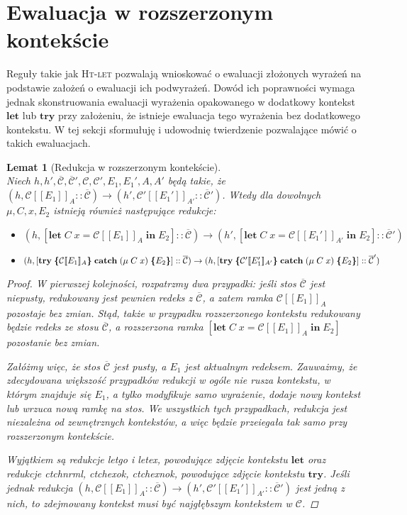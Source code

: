 \documentclass[]{pracamgr}
\renewcommand \| {\hspace{0.75em} | \hspace{0.75em} }
\renewcommand \[ {[\![}
\renewcommand \] {]\!]}
\newtheorem{lemma}{Lemat}
\theoremstyle{definition}
\newcommand{\mmod}{\mu\xspace}
\newcommand{\jlet}{\mathbf{let}\xspace}
\newcommand{\jin}{\mathbf{in}\xspace}
\newcommand{\jtry}{\mathbf{try}\xspace}
\newcommand{\jcatch}{\mathbf{catch}\xspace}
\newcommand{\letin}[4]{\jlet\; #1\; #2 = #3\; \jin\; #4\xspace}
\newcommand{\tcatch}[4]{\jtry\; \boldsymbol{\{}#1\boldsymbol{\}}\; \jcatch\; (#2\; #3)\; \boldsymbol{\{}#4\boldsymbol{\}}\xspace}
\newcommand{\ctxt}{\mathcal{C}\xspace}
\newcommand{\ctxts}{\overline{\ctxt}}
\begin{document}
\section{Ewaluacja w rozszerzonym kontekście}

Reguły takie jak \textsc{Ht-let} pozwalają wnioskować o ewaluacji złożonych wyrażeń
na podstawie założeń o ewaluacji ich podwyrażeń.
Dowód ich poprawności wymaga jednak skonstruowania ewaluacji wyrażenia opakowanego
w dodatkowy kontekst $\jlet$ lub $\jtry$ przy założeniu, że istnieje ewaluacja tego
wyrażenia bez dodatkowego kontekstu.
W tej sekcji sformułuję i udowodnię twierdzenie pozwalające mówić o takich ewaluacjach.

\begin{lemma}[Redukcja w rozszerzonym kontekście]{\ } \\
Niech $h, h', \ctxts, \ctxts', \ctxt, \ctxt', E_1, E_1', A, A'$ będą takie, że
$(h, \ctxt \[ E_1 \]_A :: \ctxts) \rightarrow (h', \ctxt' \[ E_1' \]_{A'} :: \ctxts')$.
Wtedy dla dowolnych $\mmod, C, x, E_2$ istnieją również następujące redukcje:
\begin{itemize}
 \item $(h, [ \letin{C}{x}{\ctxt \[ E_1 \]_A}{E_2}] :: \ctxts) \rightarrow
        (h', [ \letin{C}{x}{\ctxt \[ E_1'\]_{A'}}{E_2}] :: \ctxts')$
 \item $(h, [ \tcatch{\ctxt \[ E_1 \]_A}{\mmod\; C}{x}{E_2}] :: \ctxts) \rightarrow \\
        (h, [ \tcatch{\ctxt' \[ E_1' \]_{A'}}{\mmod\; C}{x}{E_2}] :: \ctxts')$
\end{itemize}
\begin{proof}
W pierwszej kolejności, rozpatrzmy dwa przypadki: jeśli stos $\ctxts$ jest niepusty,
redukowany jest pewnien redeks z $\ctxts$, a zatem ramka $\ctxt\[E_1\]_A$ pozostaje bez zmian.
Stąd, także w przypadku rozszerzonego kontekstu redukowany będzie redeks ze stosu $\ctxts$, a
rozszerzona ramka $[ \letin{C}{x}{\ctxt \[ E_1 \]_A}{E_2}]$ pozostanie bez zmian.

Załóżmy więc, że stos $\ctxts$ jest pusty, a $E_1$ jest aktualnym redeksem.
Zauważmy, że zdecydowana większość przypadków redukcji w ogóle nie rusza kontekstu,
w którym znajduje się $E_1$, a tylko modyfikuje samo wyrażenie, dodaje nowy kontekst
lub wrzuca nową ramkę na stos. We wszystkich tych przypadkach, redukcja jest niezależna od
zewnętrznych kontekstów, a więc będzie przeiegała tak samo przy rozszerzonym kontekście.

Wyjątkiem są redukcje letgo i letex, powodujące zdjęcie kontekstu $\jlet$ oraz
redukcje ctchnrml, ctchexok, ctchexnok, powodujące zdjęcie kontekstu $\jtry$.
Jeśli jednak redukcja
$(h, \ctxt \[ E_1 \]_A :: \ctxts) \rightarrow (h', \ctxt' \[ E_1' \]_{A'} :: \ctxts')$
jest jedną z nich, to zdejmowany kontekst musi być najgłębszym kontekstem w $\ctxt$.


\end{proof}
\end{lemma}
\end{document}
